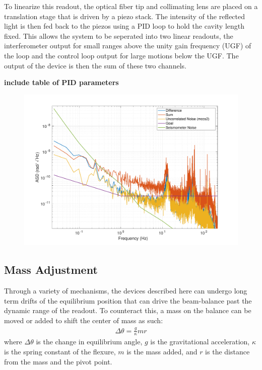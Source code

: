 \documentclass [12pt, proquest]{uwthesis}[2019]
\begin{document}
To linearize this readout, the optical fiber tip and collimating lens are placed on a translation stage that is driven by a piezo stack. The intensity of the reflected light is then fed back to the piezos using a PID loop to hold the cavity length fixed. This allows the system to be seperated into two linear readouts, the interferometer output for small ranges above the unity gain frequency (UGF) of the loop and the control loop output for large motions below the UGF. The output of the device is then the sum of these two channels.

\textbf{include table of PID parameters}

\begin{figure}%
\begin{center}
 \includegraphics[width=\textwidth]{cBRS_ReadoutNoise_11_19_19.pdf}
\caption{}
\label{cBRS_readout}
\end{center}
\end{figure}

\subsection{Mass Adjustment}

Through a variety of mechanisms, the devices described here can undergo long term drifts of the equilibrium position that can drive the beam-balance past the dynamic range of the readout. To counteract this, a mass on the balance can be moved or added to shift the center of mass as such:
\begin{align}
\Delta \theta=\frac{g}{\kappa} m r
\end{align}
where $\Delta \theta$ is the change in equilibrium angle, $g$ is the gravitational acceleration, $\kappa$ is the spring constant of the flexure, $m$ is the mass added, and $r$ is the distance from the mass and the pivot point.
\end{document}
